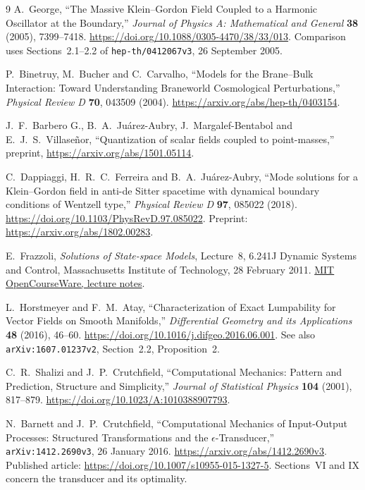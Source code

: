 \begin{thebibliography}{9}
A.~George, ``The Massive Klein--Gordon Field Coupled to a Harmonic
Oscillator at the Boundary,'' \emph{Journal of Physics A: Mathematical
and General} \textbf{38} (2005), 7399--7418.
\url{https://doi.org/10.1088/0305-4470/38/33/013}.
Comparison uses Sections~2.1--2.2 of \texttt{hep-th/0412067v3},
26 September 2005.

P.~Binetruy, M.~Bucher and C.~Carvalho, ``Models for the Brane--Bulk
Interaction: Toward Understanding Braneworld Cosmological Perturbations,''
\emph{Physical Review D} \textbf{70}, 043509 (2004).
\url{https://arxiv.org/abs/hep-th/0403154}.

J.~F.~Barbero G., B.~A.~Ju\'arez-Aubry, J.~Margalef-Bentabol and
E.~J.~S.~Villase\~nor, ``Quantization of scalar fields coupled to
point-masses,'' preprint, \url{https://arxiv.org/abs/1501.05114}.

C.~Dappiaggi, H.~R.~C.~Ferreira and B.~A.~Ju\'arez-Aubry,
``Mode solutions for a Klein--Gordon field in anti-de Sitter spacetime
with dynamical boundary conditions of Wentzell type,''
\emph{Physical Review D} \textbf{97}, 085022 (2018).
\url{https://doi.org/10.1103/PhysRevD.97.085022}.
Preprint: \url{https://arxiv.org/abs/1802.00283}.

E.~Frazzoli, \emph{Solutions of State-space Models}, Lecture~8,
6.241J Dynamic Systems and Control, Massachusetts Institute of Technology,
28 February 2011.
\href{https://ocw.mit.edu/courses/6-241j-dynamic-systems-and-control-spring-2011/resources/mit6_241js11_lec08/}{MIT OpenCourseWare, lecture notes}.

L.~Horstmeyer and F.~M.~Atay, ``Characterization of Exact Lumpability
for Vector Fields on Smooth Manifolds,''
\emph{Differential Geometry and its Applications} \textbf{48} (2016), 46--60.
\url{https://doi.org/10.1016/j.difgeo.2016.06.001}.
See also \texttt{arXiv:1607.01237v2}, Section~2.2, Proposition~2.

C.~R.~Shalizi and J.~P.~Crutchfield, ``Computational Mechanics:
Pattern and Prediction, Structure and Simplicity,''
\emph{Journal of Statistical Physics} \textbf{104} (2001), 817--879.
\url{https://doi.org/10.1023/A:1010388907793}.

N.~Barnett and J.~P.~Crutchfield, ``Computational Mechanics of
Input-Output Processes: Structured Transformations and the
$\epsilon$-Transducer,'' \texttt{arXiv:1412.2690v3}, 26 January 2016.
\url{https://arxiv.org/abs/1412.2690v3}.
Published article: \url{https://doi.org/10.1007/s10955-015-1327-5}.
Sections~VI and IX concern the transducer and its optimality.
\end{thebibliography}